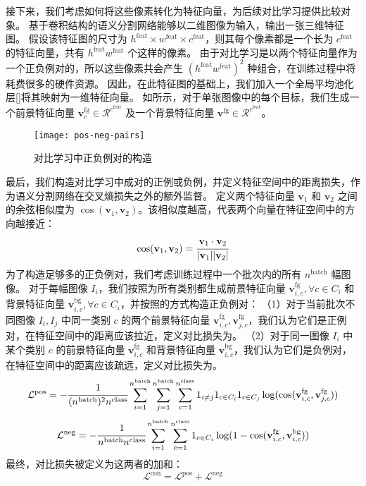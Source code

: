 接下来，我们考虑如何将这些像素转化为特征向量，为后续对比学习提供比较对象。
基于卷积结构的语义分割网络能够以二维图像为输入，输出一张三维特征图。
假设该特征图的尺寸为 $h^\text{feat} \times w^\text{feat} \times c^\text{feat}$，则其每个像素都是一个长为 $c^\text{feat}$ 的特征向量，共有 $h^\text{feat}w^\text{feat}$ 个这样的像素。
由于对比学习是以两个特征向量作为一个正负例对的，所以这些像素共会产生 $(h^\text{feat}w^\text{feat})^2$ 种组合，在训练过程中将耗费很多的硬件资源。
因此，在此特征图的基础上，我们加入一个全局平均池化层[]将其映射为一维特征向量。
如所示，对于单张图像中的每个目标，我们生成一个前景特征向量 $\mathbf{v}^\text{fg}_c \in \mathcal{R}^{c^\text{feat}}$ 及一个背景特征向量 $\mathbf{v}^\text{fg} \in \mathcal{R}^{c^\text{feat}}$。
\par
\begin{figure}[h]
\centering
\texttt{[image: pos-neg-pairs]}
\caption{对比学习中正负例对的构造}
\label{fig:pos-neg-pairs}
\end{figure}
最后，我们构造对比学习中成对的正例或负例，并定义特征空间中的距离损失，作为语义分割网络在交叉熵损失之外的额外监督。
定义两个特征向量 $\mathbf{v}_1$ 和 $\mathbf{v}_2$ 之间的余弦相似度为 $\cos(\mathbf{v}_1, \mathbf{v}_2)$。该相似度越高，代表两个向量在特征空间中的方向越接近：
\begin{equation}
\cos(\mathbf{v}_1, \mathbf{v}_2) = \cfrac{\mathbf{v}_1 \cdot \mathbf{v}_2}{\vert \mathbf{v}_1 \vert \vert \mathbf{v}_2 \vert}
\end{equation}
为了构造足够多的正负例对，我们考虑训练过程中一个批次内的所有 $n^\text{batch}$ 幅图像。
对于每幅图像 $I_i$，我们按照为所有类别都生成前景特征向量 $\mathbf{v}^\text{fg}_{i,c}, \forall c \in C_i$ 和背景特征向量 $\mathbf{v}^\text{bg}_{i,c}, \forall c \in C_i$，并按照的方式构造正负例对：
（1）对于当前批次不同图像 $I_i, I_j$ 中同一类别 $c$ 的两个前景特征向量 $\mathbf{v}^\text{fg}_{i,c}, \mathbf{v}^\text{fg}_{j,c}$，我们认为它们是正例对，在特征空间中的距离应该拉近，定义对比损失为。
（2）对于同一图像 $I_i$ 中某个类别 $c$ 的前景特征向量 $\mathbf{v}^\text{fg}_{i,c}$ 和背景特征向量 $\mathbf{v}^\text{bg}_{i,c}$，我们认为它们是负例对，在特征空间中的距离应该疏远，定义对比损失为。
\begin{equation}\label{eqn:loss-pos}
\mathcal{L}^\text{pos} = -\cfrac{1}{(n^\text{batch})^2 n^\text{class}} \sum\limits_{i=1}^{n^\text{batch}} \sum\limits_{j=1}^{n^\text{batch}} \sum\limits_{c=1}^{n^\text{class}} 1_{i \neq j} 1_{c \in C_i} 1_{c \in C_j} \log(\cos(\mathbf{v}^\text{fg}_{i,c}, \mathbf{v}^\text{fg}_{j,c}))
\end{equation}
\begin{equation}\label{eqn:loss-neg}
\mathcal{L}^\text{neg} = -\cfrac{1}{n^\text{batch} n^\text{class}} \sum\limits_{i=1}^{n^\text{batch}} \sum\limits_{c=1}^{n^\text{class}} 1_{c \in C_i} \log(1 - \cos(\mathbf{v}^\text{fg}_{i,c}, \mathbf{v}^\text{bg}_{i,c}))
\end{equation}
最终，对比损失被定义为这两者的加和：
\begin{equation}
\mathcal{L}^\text{con} = \mathcal{L}^\text{pos} + \mathcal{L}^\text{neg}
\end{equation}

